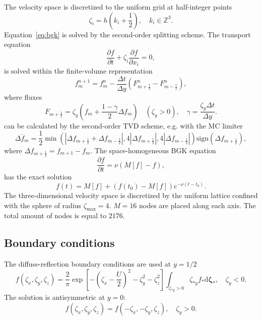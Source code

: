 \documentclass{article}
\theoremstyle{plain}
\newcommand{\dd}{\mathrm{d}}
\newcommand{\pder}[2][]{\frac{\partial#1}{\partial#2}}
\newcommand{\dzeta}{\boldsymbol{\dd\zeta}}
\begin{document}
The velocity space is discretized to the uniform grid at half-integer points
\begin{equation}\label{eq:velocity_grid}
    \zeta_i = h\left(k_i+\frac12\right), \quad k_i\in\mathbb{Z}^3.
\end{equation}
Equation~\eqref{eq:bgk} is solved by the second-order splitting scheme.
The transport equation
\begin{equation}\label{eq:split_transport}
    \pder[f]{t} + \zeta_i\pder[f]{x_i} = 0,
\end{equation}
is solved within the finite-volume representation
\begin{equation}\label{eq:finite_volume}
    f^{n+1}_m = f^n_m - \frac{\Delta{t}}{\Delta{y}}\left(F^n_{m+\frac12}-F^n_{m-\frac12}\right),
\end{equation}
where fluxes
\begin{equation}\label{eq:fluxes}
    F_{m+\frac12} = \zeta_y\left( f_m + \frac{1-\gamma}2\Delta{f_m}\right) \quad(\zeta_y>0),
    \quad \gamma = \frac{\zeta_y\Delta{t}}{\Delta{y}}.
\end{equation}
can be calculated by the second-order TVD scheme, e.g. with the MC limiter
\begin{equation}\label{eq:MC_limiter}
    \overline{\Delta{f_m}} = \frac12\min\left(
        |\Delta f_{m+\frac12} + \Delta f_{m-\frac12}|, 4|\Delta f_{m+\frac12}|, 4|\Delta f_{m-\frac12}|
    \right)\mathrm{sign}(\Delta f_{m+\frac12}),
\end{equation}
where \(\Delta f_{m+\frac12} = f_{m+1} - f_m\).
The space-homogeneous BGK equation
\begin{equation}\label{eq:homogeneous}
    \pder[f]{t} = \nu (M[f]-f),
\end{equation}
has the exact solution
\begin{equation}\label{eq:exact_bgk}
    f(t) = M[f] + (f(t_0)-M[f])e^{-\nu (t-t_0)}.
\end{equation}
The three-dimensional velocity space is discretized by the uniform lattice confined with the sphere of radius \(\zeta_{\max}=4\).
\(M=16\) nodes are placed along each axis. The total amount of nodes is equal to \(2176\).

\subsection{Boundary conditions}

The diffuse-reflection boundary conditions are used at \(y=1/2\)
\begin{equation}\label{eq:diffuse}
    f(\zeta_x,\zeta_y,\zeta_z) = \frac2{\pi} \exp\left[-\left(\zeta_x-\frac{U}{2}\right)^2-\zeta_y^2-\zeta_z^2\right]
        \int_{\zeta_{*y}>0}\zeta_{*y} f_* \dzeta_*, \quad \zeta_y<0.
\end{equation}
The solution is antisymmetric at \(y=0\):
\begin{equation}\label{eq:antisymmetry}
    f(\zeta_x,\zeta_y,\zeta_z) = f(-\zeta_x,-\zeta_y,\zeta_z), \quad \zeta_y>0.
\end{equation}

\printbibliography
\end{document}
